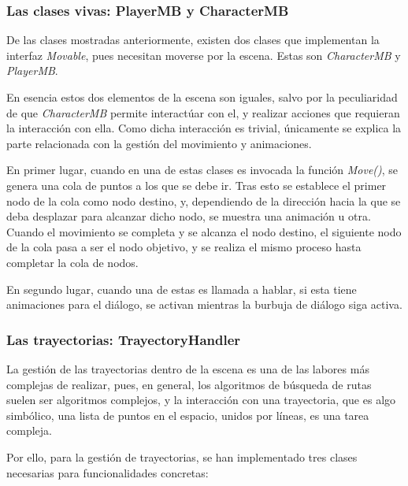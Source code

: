 \subsubsection{Las clases vivas: PlayerMB y CharacterMB}
\label{playerit2}

De las clases mostradas anteriormente, existen dos clases que implementan la interfaz \textit{Movable}, pues necesitan moverse por la escena. Estas son \textit{CharacterMB} y \textit{PlayerMB}.

En esencia estos dos elementos de la escena son iguales, salvo por la peculiaridad de que \textit{CharacterMB} permite interactúar con el, y realizar acciones que requieran la interacción con ella. Como dicha interacción es trivial, únicamente se explica la parte relacionada con la gestión del movimiento y animaciones.

En primer lugar, cuando en una de estas clases es invocada la función \textit{Move()}, se genera una cola de puntos a los que se debe ir. Tras esto se establece el primer nodo de la cola como nodo destino, y, dependiendo de la dirección hacia la que se deba desplazar para alcanzar dicho nodo, se muestra una animación u otra. Cuando el movimiento se completa y se alcanza el nodo destino, el siguiente nodo de la cola pasa a ser el nodo objetivo, y se realiza el mismo proceso hasta completar la cola de nodos. 

En segundo lugar, cuando una de estas es llamada a hablar, si esta tiene animaciones para el diálogo, se activan mientras la burbuja de diálogo siga activa.

\subsubsection{Las trayectorias: TrayectoryHandler}
\label{trajectoryit2}

La gestión de las trayectorias dentro de la escena es una de las labores más complejas de realizar, pues, en general, los algoritmos de búsqueda de rutas suelen ser algoritmos complejos, y la interacción con una trayectoria, que es algo simbólico, una lista de puntos en el espacio, unidos por líneas, es una tarea compleja.

Por ello, para la gestión de trayectorias, se han implementado tres clases necesarias para funcionalidades concretas:

